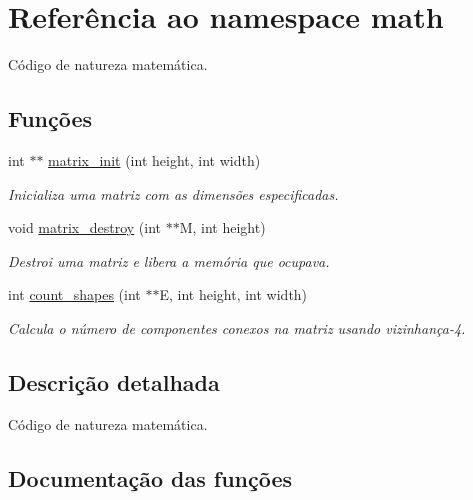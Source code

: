 \hypertarget{namespacemath}{}\section{Referência ao namespace math}
\label{namespacemath}


Código de natureza matemática.  


\subsection*{Funções}
\begin{DoxyCompactItemize}
\item 
int $\ast$$\ast$ \mbox{\hyperlink{namespacemath_ac47b11361b7d12063c2c2d3c3f030e6d}{matrix\+\_\+init}} (int height, int width)
\begin{DoxyCompactList}\small\item\em Inicializa uma matriz com as dimensões especificadas. \end{DoxyCompactList}\item 
void \mbox{\hyperlink{namespacemath_ab71def2c0ba5a16ca9b8b0ad9ed7034f}{matrix\+\_\+destroy}} (int $\ast$$\ast$M, int height)
\begin{DoxyCompactList}\small\item\em Destroi uma matriz e libera a memória que ocupava. \end{DoxyCompactList}\item 
int \mbox{\hyperlink{namespacemath_aacf8a030574da06fa612813bf3ffa705}{count\+\_\+shapes}} (int $\ast$$\ast$E, int height, int width)
\begin{DoxyCompactList}\small\item\em Calcula o número de componentes conexos na matriz usando vizinhança-\/4. \end{DoxyCompactList}\end{DoxyCompactItemize}


\subsection{Descrição detalhada}
Código de natureza matemática. 

\subsection{Documentação das funções}
\mbox{\label{namespacemath_aacf8a030574da06fa612813bf3ffa705}} 
